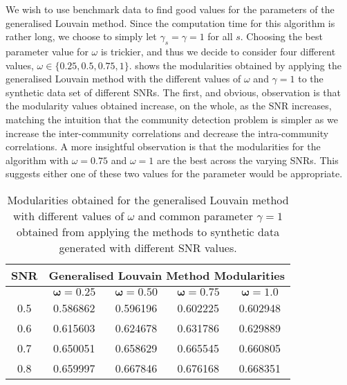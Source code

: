 We wish to use benchmark data to find good values for the parameters of the generalised Louvain method.
Since the computation time for this algorithm is rather long, we choose to simply let $\gamma_{s}=\gamma=1$ for all $s$.
Choosing the best parameter value for $\omega$ is trickier, and thus we decide to consider four different values, $\omega \in \{ 0.25,0.5,0.75,1 \}$.
 shows the modularities obtained by applying the generalised Louvain method with the different values of $\omega$ and $\gamma=1$ to the synthetic data set of different SNRs.
The first, and obvious, observation is that the modularity values obtained increase, on the whole, as the SNR increases, matching the intuition that the community detection problem is simpler as we increase the inter-community correlations and decrease the intra-community correlations.
A more insightful observation is that the modularities for the algorithm with $\omega=0.75$ and $\omega=1$ are the best across the varying SNRs.
This suggests either one of these two values for the parameter would be appropriate.

\begin{table}[htbp]
  \centering
  \caption{Modularities obtained for the generalised Louvain method with different values of $\omega$ and common parameter $\gamma = 1$ obtained from applying the methods to synthetic data generated with different SNR values.}
    \begin{tabular}{| c | c | c | c | c |}
    \hline
    \textbf{SNR} & \multicolumn{4}{|c|}{\textbf{Generalised Louvain Method Modularities}}\\
    \hline
    & $\bm{\omega = 0.25}$ & $\bm{\omega = 0.50}$ & $\bm{\omega = 0.75}$ & $\bm{\omega = 1.0}$\\
    0.5   & 0.586862 & 0.596196 & 0.602225 & 0.602948 \\
    0.6   & 0.615603 & 0.624678 & 0.631786 & 0.629889 \\
    0.7   & 0.650051 & 0.658629 & 0.665545 & 0.660805 \\
    0.8   & 0.659997 & 0.667846 & 0.676168 & 0.668351 \\
    \hline
    \end{tabular}%
  \label{tab:generalisedLouvainMethodModularitiesSyntheticData}%
\end{table}%

